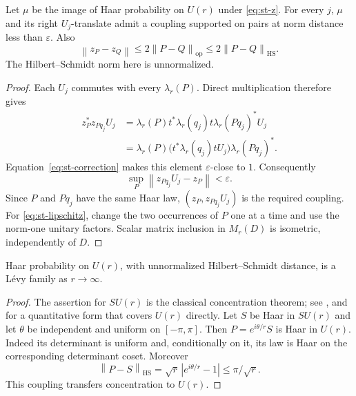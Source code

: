 \begin{lemma}\label{lem:st-haar}
Let \(\mu\) be the image of Haar probability on \(U(r)\) under
\eqref{eq:st-z}. For every \(j\), \(\mu\) and its right \(U_j\)-translate
admit a coupling supported on pairs at norm distance less than
\(\varepsilon\). Also
\begin{equation}\label{eq:st-lipschitz}
 \left\|z_P-z_Q\right\|\leq 2\left\|P-Q\right\|_{\mathrm{op}}
                  \leq2\left\|P-Q\right\|_{\mathrm{HS}}.
\end{equation}
The Hilbert--Schmidt norm here is unnormalized.
\end{lemma}
\begin{proof}
Each \(U_j\) commutes with every \(\lambda_r(P)\). Direct multiplication
therefore gives
\[
 \begin{split}
 z_P^*z_{Pq_j}U_j
 &=\lambda_r(P)t^*\lambda_r(q_j)t\lambda_r(Pq_j)^*U_j\\
 &=\lambda_r(P)\bigl(t^*\lambda_r(q_j)tU_j\bigr)\lambda_r(Pq_j)^*.
 \end{split}
\]
Equation~\eqref{eq:st-correction} makes this element
\(\varepsilon\)-close to \(1\). Consequently
\begin{equation}\label{eq:st-coupling}
 \sup_P\left\|z_{Pq_j}U_j-z_P\right\|<\varepsilon.
\end{equation}
Since \(P\) and \(Pq_j\) have the same Haar law,
\((z_P,z_{Pq_j}U_j)\) is the required coupling.
For \eqref{eq:st-lipschitz}, change the two occurrences of \(P\)
one at a time and use the norm-one unitary factors.
Scalar matrix inclusion in \(M_r(D)\) is isometric, independently
of \(D\).
\end{proof}

\begin{lemma}\label{lem:st-unitary-levy}
Haar probability on \(U(r)\), with unnormalized Hilbert--Schmidt
distance, is a L\'evy family as \(r\to\infty\).
\end{lemma}
\begin{proof}
The assertion for \(SU(r)\) is the classical concentration theorem;
see \cite[Example~2.5]{GiordanoPestov2007}, and \cite[Theorem~5.17]{Meckes2019} for a
quantitative form that covers \(U(r)\) directly. Let \(S\) be Haar in \(SU(r)\) and let
\(\theta\) be independent and uniform on \([-\pi,\pi]\).
Then \(P=e^{i\theta/r}S\) is Haar in \(U(r)\). Indeed its determinant
is uniform and, conditionally on it, its law is Haar on the
corresponding determinant coset. Moreover
\[
 \left\|P-S\right\|_{\mathrm{HS}}
 =\sqrt r\,|e^{i\theta/r}-1|\leq\pi/\sqrt r.
\]
This coupling transfers concentration to \(U(r)\).
\end{proof}


